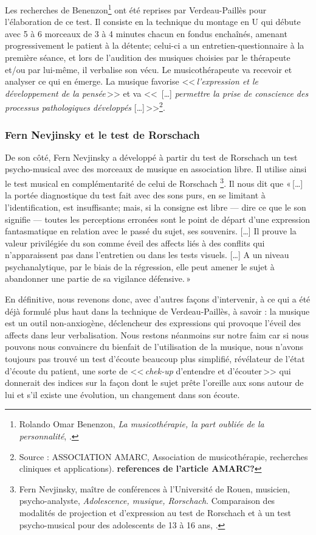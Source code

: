 Les recherches de Benenzon\footnote{Rolando Omar
  Benenzon, \textsl{La musicothérapie, la part oubliée de la
    personnalité}, \cite{benenzon:musicotherapie}.} ont été reprises par
Verdeau-Paillès pour l'élaboration de ce test. Il consiste en la technique du montage en U qui débute avec 5 à 6 morceaux de 3 à 4 minutes chacun en fondus enchaînés, amenant progressivement le patient à la détente; celui-ci a un entretien-questionnaire à la première
séance, et lors de l'audition des musiques choisies par le thérapeute
et/ou par lui-même, il  verbalise son vécu. Le musicothérapeute
va recevoir et analyser ce qui en émerge. 
La musique favorise  <<\,\emph{l'expression et le développement
	de la pensée}\,>> et  va <<\, [\ldots] \emph{permettre la prise de conscience des processus pathologiques développés} [\ldots]\,>>\footnote{Source : ASSOCIATION AMARC,
  Association de musicothérapie, recherches cliniques et
  applications). \textbf{references de l'article AMARC?}}.


 \subsubsection{Fern Nevjinsky et le test de Rorschach}
 
 De son côté, Fern Nevjinsky a développé à partir du  test de Rorschach un test psycho-musical avec des morceaux
de musique en association libre. Il utilise ainsi le test
musical en complémentarité de celui de Rorschach%
\footnote{Fern Nevjinsky, maître de conférences à l'Université de Rouen, musicien, psycho-analyste, \textsl{Adolescence, musique, Rorschach}. Comparaison des modalités de projection et d'expression au test de Rorschach et à un test psycho-musical pour des adolescents de 13 à 16 ans,
  \cite{nevjinsky:adolescence}.}. Il nous dit  que  «\,[\ldots] la
portée diagnostique du test fait avec des sons purs, en se limitant à
l'identification, est insuffisante; mais, si la consigne est libre ---
dire ce que le son signifie --- toutes les perceptions erronées sont
le point de départ d'une expression fantasmatique en relation avec le
passé du sujet, ses souvenirs. [\ldots] 
Il prouve  la valeur privilégiée du son comme éveil
des affects liés à des conflits qui n'apparaissent pas dans
l'entretien ou dans les tests visuels.  [\ldots] A un niveau
psychanalytique, par le biais de la régression, elle peut amener le sujet à abandonner une partie de sa vigilance défensive.\,»

En définitive, nous revenons donc, avec d'autres façons d'intervenir,
à ce qui a été déjà formulé plus haut dans la technique de
 Verdeau-Paillès, à savoir : la musique est un outil non-anxiogène, déclencheur des expressions qui provoque
l'éveil des affects dans  leur verbalisation. Nous restons néanmoins sur notre faim car si nous pouvons nous convaincre du bienfait de l'utilisation de la musique, nous n'avons toujours pas trouvé un test d'écoute beaucoup plus simplifié, révélateur de l'état d'écoute du patient, une sorte de <<\,\emph{chek-up} d'entendre et d'écouter\,>>
 qui donnerait des indices sur la façon dont le sujet prête l'oreille aux sons autour de lui et s'il existe une évolution, un changement dans son écoute.


